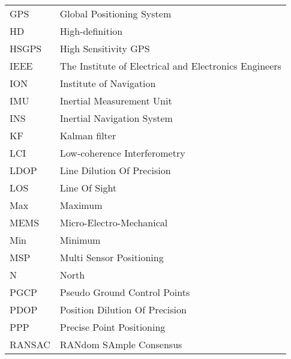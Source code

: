 \begin{tabular}{l@{\hspace{2cm}}l}
GPS & Global Positioning System\\[2.0ex]
HD & High-definition\\[2.0ex]
HSGPS & High Sensitivity GPS\\[2.0ex]
IEEE & The Institute of Electrical and Electronics Engineers\\[2.0ex]
ION & Institute of Navigation\\[2.0ex]
IMU & Inertial Measurement Unit\\[2.0ex]
INS & Inertial Navigation System\\[2.0ex]
KF & Kalman filter\\[2.0ex]
LCI & Low-coherence Interferometry\\[2.0ex]
LDOP & Line Dilution Of Precision\\[2.0ex]
LOS & Line Of Sight\\[2.0ex]
Max & Maximum\\[2.0ex]
MEMS & Micro-Electro-Mechanical\\[2.0ex]
Min & Minimum\\[2.0ex]
MSP & Multi Sensor Positioning\\[2.0ex]
N & North\\[2.0ex]
PGCP & Pseudo Ground Control Points\\[2.0ex]
PDOP & Position Dilution Of Precision\\[2.0ex]
PPP & Precise Point Positioning\\[2.0ex]
RANSAC & RANdom SAmple Consensus\\[2.0ex]
\end{tabular}
\newpage
